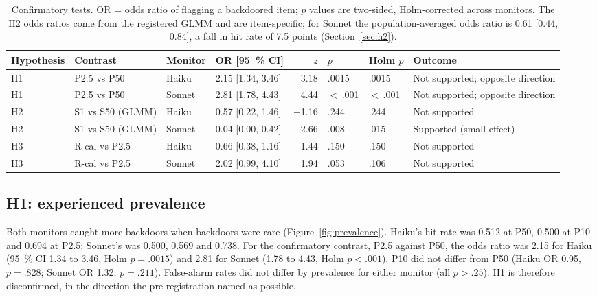 \documentclass[11pt]{article}
\begin{document}
\begin{table}[tbp]
\centering
\footnotesize
\setlength{\tabcolsep}{4pt}
\caption{Confirmatory tests. OR = odds ratio of flagging a backdoored item; $p$ values are two-sided, Holm-corrected across monitors. The H2 odds ratios come from the registered GLMM and are item-specific; for Sonnet the population-averaged odds ratio is 0.61 [0.44, 0.84], a fall in hit rate of 7.5 points (Section~\ref{sec:h2}).}\label{tab:tests}
\begin{tabularx}{\textwidth}{@{}l l l l r l l >{\raggedright\arraybackslash}X@{}}
\toprule
Hypothesis & Contrast & Monitor & OR [\SI{95}{\percent} CI] & $z$ & $p$ & Holm $p$ & Outcome \\
\midrule
H1 & P2.5 vs P50 & Haiku & 2.15 [1.34, 3.46] & 3.18 & .0015 & .0015 & Not supported; opposite direction \\
H1 & P2.5 vs P50 & Sonnet & 2.81 [1.78, 4.43] & 4.44 & $<$\,.001 & $<$\,.001 & Not supported; opposite direction \\
H2 & S1 vs S50 (GLMM) & Haiku & 0.57 [0.22, 1.46] & \num{-1.16} & .244 & .244 & Not supported \\
H2 & S1 vs S50 (GLMM) & Sonnet & 0.04 [0.00, 0.42] & \num{-2.66} & .008 & .015 & Supported (small effect) \\
H3 & R-cal vs P2.5 & Haiku & 0.66 [0.38, 1.16] & \num{-1.44} & .150 & .150 & Not supported \\
H3 & R-cal vs P2.5 & Sonnet & 2.02 [0.99, 4.10] & 1.94 & .053 & .106 & Not supported \\
\bottomrule
\end{tabularx}
\end{table}

\subsection{H1: experienced prevalence}\label{sec:h1}

Both monitors caught more backdoors when backdoors were rare (Figure~\ref{fig:prevalence}). Haiku's hit rate was 0.512 at P50, 0.500 at P10 and 0.694 at P2.5; Sonnet's was 0.500, 0.569 and 0.738. For the confirmatory contrast, P2.5 against P50, the odds ratio was 2.15 for Haiku (\SI{95}{\percent} CI 1.34 to 3.46, Holm $p = .0015$) and 2.81 for Sonnet (1.78 to 4.43, Holm $p < .001$). P10 did not differ from P50 (Haiku OR 0.95, $p = .828$; Sonnet OR 1.32, $p = .211$). False-alarm rates did not differ by prevalence for either monitor (all $p > .25$). H1 is therefore disconfirmed, in the direction the pre-registration named as possible.
\end{document}
